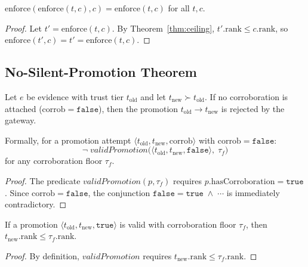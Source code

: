 \documentclass[11pt]{article}
\newcommand{\enforce}{\mathrm{enforce}}
\newcommand{\corrob}{\mathrm{corrob}}
\begin{document}
\begin{corollary}
\label{cor:idemp}
$\enforce(\enforce(t,c),c) = \enforce(t,c)$ for all $t, c$.
\end{corollary}

\begin{proof}
Let $t' = \enforce(t,c)$.  By Theorem~\ref{thm:ceiling},
$t'.\mathrm{rank} \leq c.\mathrm{rank}$, so
$\enforce(t', c) = t' = \enforce(t,c)$.
\end{proof}

\subsection{No-Silent-Promotion Theorem}
\label{sec:formal:promotion}

\begin{theorem}
\label{thm:no-silent-promotion}
Let $e$ be evidence with trust tier $t_{\mathrm{old}}$ and let
$t_{\mathrm{new}} \succ t_{\mathrm{old}}$.  If no corroboration
is attached (\ie $\corrob = \texttt{false}$), then the promotion
$t_{\mathrm{old}} \to t_{\mathrm{new}}$ is rejected by the
gateway.

Formally, for a promotion attempt
$\langle t_{\mathrm{old}}, t_{\mathrm{new}}, \corrob \rangle$
with $\corrob = \texttt{false}$:
\[
  \neg\;\mathit{validPromotion}
    \bigl(\langle t_{\mathrm{old}}, t_{\mathrm{new}},
    \texttt{false}\rangle,\; \tau_f\bigr)
\]
for any corroboration floor $\tau_f$.
\end{theorem}

\begin{proof}
The predicate $\mathit{validPromotion}(p, \tau_f)$ requires
$p.\mathrm{hasCorroboration} = \texttt{true}$.  Since
$\corrob = \texttt{false}$, the conjunction
$\texttt{false} = \texttt{true} \;\wedge\; \cdots$
is immediately contradictory.
\end{proof}

\begin{theorem}
\label{thm:promotion-bound}
If a promotion $\langle t_{\mathrm{old}}, t_{\mathrm{new}},
\texttt{true}\rangle$ is valid with corroboration floor $\tau_f$,
then $t_{\mathrm{new}}.\mathrm{rank} \leq \tau_f.\mathrm{rank}$.
\end{theorem}

\begin{proof}
By definition, $\mathit{validPromotion}$ requires
$t_{\mathrm{new}}.\mathrm{rank} \leq \tau_f.\mathrm{rank}$.
\end{proof}
\end{document}

